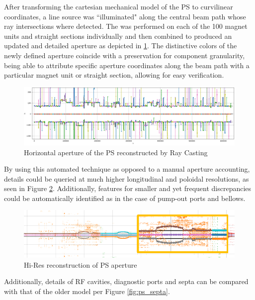 After transforming the cartesian mechanical model of the PS to curvilinear coordinates, a line source was ``illuminated" along the central beam path whose ray intersections where detected. The was performed on each of the 100 magnet units and straight sections individually and then combined to produced an updated and detailed aperture as depicted in \ref{fig:ps_aperture}. The distinctive colors of the newly defined aperture coincide with a preservation for component granularity, being able to attribute specific aperture coordinates along the beam path with a particular magnet unit or straight section, allowing for easy verification.

\begin{figure}
    \centering
    \includegraphics[width=\linewidth]{figs/ps_aperture.png}
    \caption{Horizontal aperture of the PS reconstructed by Ray Casting}
    \label{fig:ps_aperture}
\end{figure}

By using this automated technique as opposed to a manual aperture accounting, details could be queried at much higher longitudinal and poloidal resolutions, as seen in Figure \ref{fig:ps_aperture_hi_res}. Additionally, features for smaller and yet frequent discrepancies could be automatically identified as in the case of pump-out ports and bellows.

\begin{figure}
    \centering
    \includegraphics{figs/apertture_hi_res.PNG}
    \caption{Hi-Res reconstruction of PS aperture}
    \label{fig:ps_aperture_hi_res}
\end{figure}

Additionally, details of RF cavities, diagnostic ports and septa can be compared with that of the older model per Figure \ref{fig:ps_septa}.


